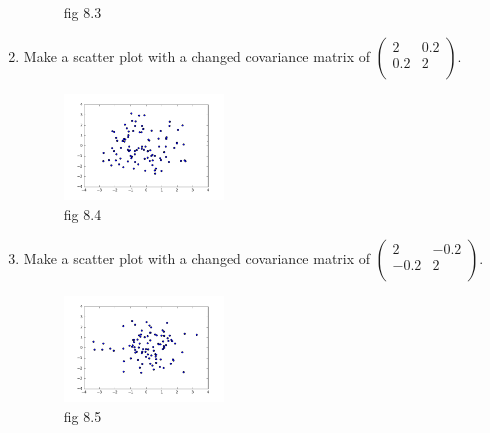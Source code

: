 \documentclass[a4paper]{article}
\theoremstyle{definition}
\newenvironment{soln}{
    \leavevmode\color{blue}\ignorespaces
}{}
\begin{document}
\begin{enumerate}
\begin{soln}
\begin{figure}[H]
	       \captionsetup{labelformat=empty}
	       \caption{fig 8.3}
	       \label{fig:my_label}
	   \end{figure}
	\end{soln}
\item Make a scatter plot with a changed covariance matrix of $\begin{pmatrix}
    2 & 0.2 \\ 0.2 & 2\\
  \end{pmatrix}$.\\
  	\begin{soln}
	   \begin{figure}[H]
	       \centering
	       \includegraphics[width=0.4\textwidth]{hw1_8_4.png}
	       \captionsetup{labelformat=empty}
	       \caption{fig 8.4}
	       \label{fig:my_label}
	   \end{figure}
	\end{soln}
\item Make a scatter plot with a changed covariance matrix of $\begin{pmatrix}
    2 & -0.2 \\ -0.2 & 2\\
  \end{pmatrix}$.	\\
  	\begin{soln}
	   \begin{figure}[H]
	       \centering
	       \includegraphics[width=0.4\textwidth]{hw1_8_5.png}
	       \captionsetup{labelformat=empty}
	       \caption{fig 8.5}
	       \label{fig:my_label}
	   \end{figure}
	\end{soln}
\end{enumerate}





\end{document}
